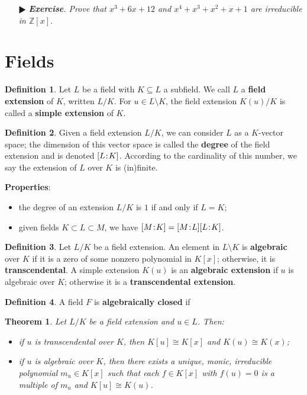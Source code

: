 \documentclass[11pt]{amsart}
\newtheorem*{theorem*}{Theorem}
\theoremstyle{definition}
\newtheorem*{definition*}{Definition}
\renewcommand\:{\colon}
\newcommand{\Z}{\mathds{Z}}
\newcommand{\1}{\mathds{1}}
\renewcommand{\d}[2]{[#1 \hspace{-.2em} : \hspace{-.2em} #2]}
\newcommand{\exc}[1]{\vspace{-2.5pt}\begin{itemize}[leftmargin=15pt]\item[$\RHD$] \textit{\textbf{Exercise}. #1}\end{itemize}}
\begin{document}
\exc{Prove that $x^3 + 6x + 12$ and $x^4 + x^3 + x^2 + x + 1$ are irreducible in $\Z[x]$.}

\clearpage











\section{Fields}

\begin{definition*}
	 Let $L$ be a field with $K \subseteq L$ a subfield. We call $L$ a \textbf{field extension} of $K$, written $L/K$. For $u \in L \setminus K$, the field extension $K(u)/K$ is called a \textbf{simple extension} of $K$.
\end{definition*}

\begin{definition*}
	Given a field extension $L/K$, we can consider $L$ as a $K$-vector space; the dimension of this vector space is called the \textbf{degree} of the field extension and is denoted $\d LK$. According to the cardinality of this number, we say the extension of $L$ over $K$ is (in)finite.
\end{definition*}

\noindent \textbf{Properties}:
\begin{itemize}[leftmargin=*]\setlength\itemsep{0em}
	\item the degree of an extension $L/K$ is $1$ if and only if $L = K$;
	\item given fields $K \subset L \subset M$, we have $\d MK = \d ML \d LK$.
\end{itemize}

\begin{definition*}
	Let $L/K$ be a field extension. An element in $L \setminus K$ is \textbf{algebraic} over $K$ if it is a zero of some nonzero polynomial in $K[x]$; otherwise, it is \textbf{transcendental}. A simple extension $K(u)$ is an \textbf{algebraic extension} if $u$ is algebraic over $K$; otherwise it is a \textbf{transcendental extension}.
\end{definition*}

\begin{definition*}
	A field $F$ is \textbf{algebraically closed} if 
\end{definition*}

\begin{theorem*}
	Let $L/K$ be a field extension and $u \in L$. Then:
	\begin{itemize}[leftmargin=12.5pt]\setlength\itemsep{0em}
		\item if $u$ is transcendental over $K$, then $K[u] \cong K[x]$ and $K(u) \cong K(x)$;
		\item if $u$ is algebraic over $K$, then there exists a unique, monic, irreducible polynomial $m_u \in K[x]$ such that each $f \in K[x]$ with $f(u) = 0$ is a multiple of $m_u$ and $K[u] \cong K(u)$.
	\end{itemize}
\end{theorem*}
\end{document}
